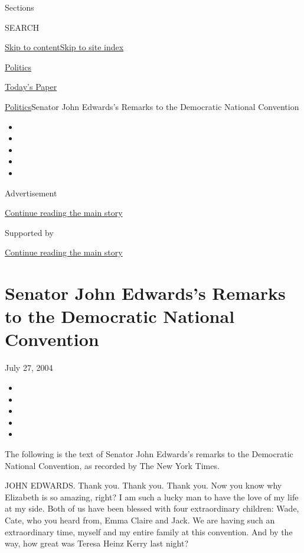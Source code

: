 Sections

SEARCH

\protect\hyperlink{site-content}{Skip to
content}\protect\hyperlink{site-index}{Skip to site index}

\href{https://www.nytimes.com/section/politics}{Politics}

\href{https://myaccount.nytimes.com/auth/login?response_type=cookie\&client_id=vi}{}

\href{https://www.nytimes.com/section/todayspaper}{Today's Paper}

\href{/section/politics}{Politics}\textbar{}Senator John Edwards's
Remarks to the Democratic National Convention

\begin{itemize}
\item
\item
\item
\item
\item
\end{itemize}

Advertisement

\protect\hyperlink{after-top}{Continue reading the main story}

Supported by

\protect\hyperlink{after-sponsor}{Continue reading the main story}

\hypertarget{senator-john-edwardss-remarks-to-the-democratic-national-convention}{%
\section{Senator John Edwards's Remarks to the Democratic National
Convention}\label{senator-john-edwardss-remarks-to-the-democratic-national-convention}}

July 27, 2004

\begin{itemize}
\item
\item
\item
\item
\item
\end{itemize}

The following is the text of Senator John Edwards's remarks to the
Democratic National Convention, as recorded by The New York Times.

JOHN EDWARDS. Thank you. Thank you. Thank you. Now you know why
Elizabeth is so amazing, right? I am such a lucky man to have the love
of my life at my side. Both of us have been blessed with four
extraordinary children: Wade, Cate, who you heard from, Emma Claire and
Jack. We are having such an extraordinary time, myself and my entire
family at this convention. And by the way, how great was Teresa Heinz
Kerry last night?

